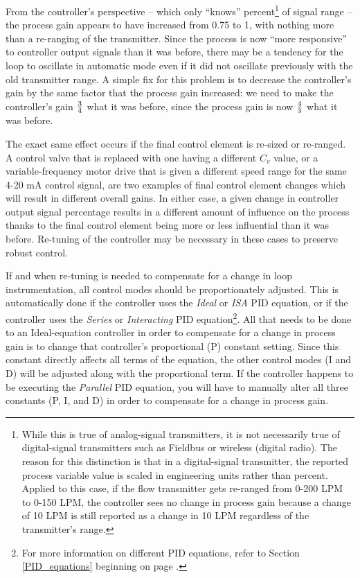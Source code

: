 From the controller's perspective -- which only ``knows'' percent\footnote{While this is true of analog-signal transmitters, it is not necessarily true of digital-signal transmitters such as Fieldbus or wireless (digital radio).  The reason for this distinction is that in a digital-signal transmitter, the reported process variable value is scaled in engineering units rather than percent.  Applied to this case, if the flow transmitter gets re-ranged from 0-200 LPM to 0-150 LPM, the controller sees no change in process gain because a change of 10 LPM is still reported as a change in 10 LPM regardless of the transmitter's range.} of signal range -- the process gain appears to have increased from 0.75 to 1, with nothing more than a re-ranging of the transmitter.  Since the process is now ``more responsive'' to controller output signals than it was before, there may be a tendency for the loop to oscillate in automatic mode even if it did not oscillate previously with the old transmitter range.  A simple fix for this problem is to decrease the controller's gain by the same factor that the process gain increased: we need to make the controller's gain $3 \over 4$ what it was before, since the process gain is now $4 \over 3$ what it was before.

The exact same effect occurs if the final control element is re-sized or re-ranged.  A control valve that is replaced with one having a different $C_v$ value, or a variable-frequency motor drive that is given a different speed range for the same 4-20 mA control signal, are two examples of final control element changes which will result in different overall gains.  In either case, a given change in controller output signal percentage results in a different amount of influence on the process thanks to the final control element being more or less influential than it was before.  Re-tuning of the controller may be necessary in these cases to preserve robust control.    

If and when re-tuning is needed to compensate for a change in loop instrumentation, all control modes should be proportionately adjusted.  This is automatically done if the controller uses the \textit{Ideal} or \textit{ISA} PID equation, or if the controller uses the \textit{Series} or \textit{Interacting} PID equation\footnote{For more information on different PID equations, refer to Section \ref{PID_equations} beginning on page \pageref{PID_equations}.}.  All that needs to be done to an Ideal-equation controller in order to compensate for a change in process gain is to change that controller's proportional (P) constant setting.  Since this constant directly affects all terms of the equation, the other control modes (I and D) will be adjusted along with the proportional term.  If the controller happens to be executing the \textit{Parallel} PID equation, you will have to manually alter all three constants (P, I, and D) in order to compensate for a change in process gain.    

